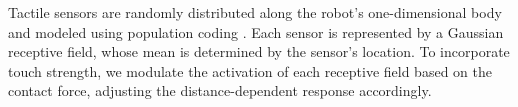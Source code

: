%


Tactile sensors are randomly distributed along the robot's one-dimensional body and modeled using population coding \cite{Panzeri2010PopulationCoding}. Each sensor is represented by a Gaussian receptive field, whose mean is determined by the sensor's location. %
To incorporate touch strength, we modulate the activation of each receptive field based on the contact force, adjusting the distance-dependent response accordingly.  


